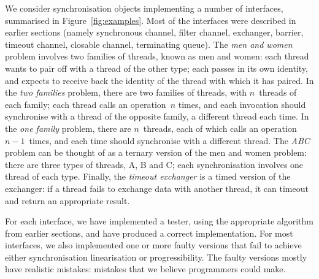 We consider synchronisation objects implementing a number of interfaces,
summarised in Figure~\ref{fig:examples}.  Most of the interfaces were
described in earlier sections (namely synchronous channel, filter channel,
exchanger, barrier, timeout channel, closable channel, terminating queue).
The \emph{men and women} problem involves two families of threads, known as
men and women: each thread wants to pair off with a thread of the other type;
each passes in its own identity, and expects to receive back the identity of
the thread with which it has paired.  In the \emph{two families} problem,
there are two families of threads, with $n$~threads of each family; each
thread calls an operation~$n$ times, and each invocation should synchronise
with a thread of the opposite family, a different thread each time.  In the
\emph{one family} problem, there are $n$~threads, each of which calls an
operation $n-1$~times, and each time should synchronise with a different
thread.  The \emph{ABC} problem can be thought of as a ternary version of the
men and women problem: there are three types of threads, A, B and C; each
synchronisation involves one thread of each type.  Finally, the \emph{timeout
  exchanger} is a timed version of the exchanger: if a thread fails to
exchange data with another thread, it can timeout and return an appropriate
result.



For each interface, we have implemented a tester, using the appropriate
algorithm from earlier sections, and have produced a correct implementation.
For most interfaces, we also implemented one or more faulty versions that fail
to achieve either synchronisation linearisation or progressibility.  The
faulty versions mostly have realistic mistakes: mistakes that we believe
programmers could make.

